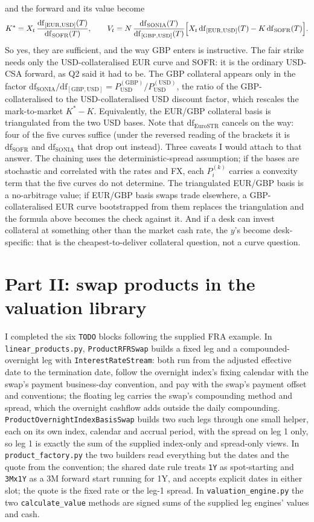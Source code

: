 \documentclass[10pt]{article}
\newcommand{\code}[1]{\texttt{#1}}
\newcommand{\df}[1]{\mathrm{df}_{#1}}
\newcommand{\usd}{\mathrm{USD}}\newcommand{\eur}{\mathrm{EUR}}\newcommand{\gbp}{\mathrm{GBP}}
\begin{document}
and the forward and its value become
\[
K^{*}=X_t\,\frac{\df{[\mathrm{EUR},\mathrm{USD}]}(T)}{\df{\mathrm{SOFR}}(T)},\qquad
V_t=N\,\frac{\df{\mathrm{SONIA}}(T)}{\df{[\mathrm{GBP},\mathrm{USD}]}(T)}\Bigl[X_t\,\df{[\mathrm{EUR},\mathrm{USD}]}(T)-K\,\df{\mathrm{SOFR}}(T)\Bigr].
\]
So yes, they are sufficient, and the way GBP enters is instructive. The fair strike needs only the USD-collateralised EUR curve and SOFR:
it is the ordinary USD-CSA forward, as Q2 said it had to be. The GBP collateral appears only in the factor
$\df{\mathrm{SONIA}}/\df{[\mathrm{GBP},\mathrm{USD}]}=P^{(\gbp)}_{\usd}/P^{(\usd)}_{\usd}$, the ratio of the GBP-collateralised to the
USD-collateralised USD discount factor, which rescales the mark-to-market $K^{*}-K$. Equivalently, the EUR/GBP collateral basis is
triangulated from the two USD bases. Note that $\df{\mathrm{EuroSTR}}$ cancels on the way: four of the five curves suffice (under the
reversed reading of the brackets it is $\df{\mathrm{SOFR}}$ and $\df{\mathrm{SONIA}}$ that drop out instead). Three caveats I would attach to that answer. The chaining uses the deterministic-spread
assumption; if the bases are stochastic and correlated with the rates and FX, each $P^{(k)}_i$ carries a convexity term that the five curves do not
determine. The triangulated EUR/GBP basis is a no-arbitrage value; if EUR/GBP
basis swaps trade elsewhere, a GBP-collateralised EUR curve bootstrapped from them replaces the triangulation and the formula above
becomes the check against it.
And if a desk can invest collateral at something other than the market cash rate, the $y$'s become desk-specific: that is the
cheapest-to-deliver collateral question, not a curve question.

\section*{Part II: swap products in the valuation library}
I completed the six \code{TODO} blocks following the supplied FRA example. In \code{linear\_products.py}, \code{ProductRFRSwap}
builds a fixed leg and a compounded-overnight leg with \code{InterestRateStream}: both run from the adjusted effective date to the
termination date, follow the overnight index's fixing calendar with the swap's payment business-day convention, and pay with the
swap's payment offset and conventions; the floating leg carries the swap's compounding method and spread, which the overnight cashflow
adds outside the daily compounding. \code{ProductOvernightIndexBasisSwap} builds two such legs through one small helper, each on its
own index, calendar and accrual period, with the spread on leg 1 only, so leg 1 is exactly the sum of the supplied index-only and
spread-only views. In \code{product\_factory.py} the two builders read everything but the dates and the quote from the convention;
the shared date rule treats \code{1Y} as spot-starting and \code{3Mx1Y} as a 3M forward start running for 1Y, and accepts explicit
dates in either slot; the quote is the fixed rate or the leg-1 spread. In \code{valuation\_engine.py} the two \code{calculate\_value}
methods are signed sums of the supplied leg engines' values and cash.
\end{document}
